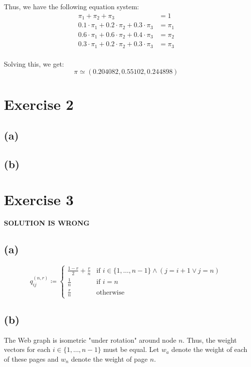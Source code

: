 \documentclass[12pt]{article}
\begin{document}
Thus, we have the following equation system:
\begin{align*}
	\pi_1 + \pi_2 + \pi_3 &= 1 \\
	0.1 \cdot \pi_1 + 0.2 \cdot \pi_2 + 0.3 \cdot \pi_3 &= \pi_1 \\
	0.6 \cdot \pi_1 + 0.6 \cdot \pi_2 + 0.4 \cdot \pi_3 &= \pi_2 \\
	0.3 \cdot \pi_1 + 0.2 \cdot \pi_2 + 0.3 \cdot \pi_3 &= \pi_3 \\
\end{align*}

Solving this, we get:
\begin{equation*}
	\pi \simeq \left(0.204082, 0.55102, 0.244898 \right)
\end{equation*}

\section*{Exercise 2}
\subsection*{(a)}
\subsection*{(b)}

\section*{Exercise 3}
\textbf{SOLUTION IS WRONG}
\subsection*{(a)}
\begin{equation*}
	q_{ij}^{(n,r)} \coloneqq
	\begin{cases}
		\frac{1-r}{2} + \frac{r}{n} & \text{if } i \in \{1, \dots, n-1\} \land (j = i+1 \lor j=n) \\
		\frac{1}{n} & \text{if } i=n \\
		\frac{r}{n} & \text{otherwise}
	\end{cases}
\end{equation*}

\subsection*{(b)}
The Web graph is isometric "under rotation" around node $n$. Thus, the weight vectors for each $i \in \{1, \dots, n-1\}$ must be equal.
Let $w_a$ denote the weight of each of these pages and $w_n$ denote the weight of page $n$.
\end{document}
